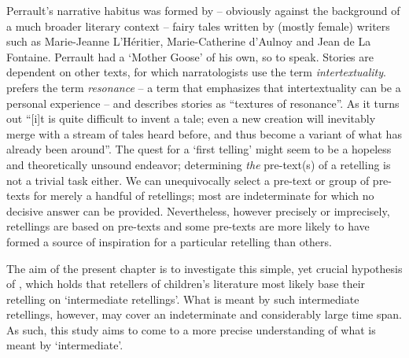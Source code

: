 Perrault's narrative habitus was formed by -- obviously against the background of a much broader literary context -- fairy tales written by (mostly female) writers such as Marie-Jeanne L'Héritier, Marie-Catherine d'Aulnoy and Jean de La Fontaine\autocites[76]{warner:1995}[44]{zipes:2012}. Perrault had a `Mother Goose' of his own, so to speak\autocite[44--45]{zipes:2012}. Stories are dependent on other texts, for which narratologists use the term \emph{intertextuality}. \citeauthor{frank:2010} prefers the term \emph{resonance} -- a term that emphasizes that intertextuality can be a personal experience -- and describes stories as ``textures of resonance''\autocite[37]{frank:2010}. As it turns out ``[i]t is quite difficult to invent a tale; even a new creation will inevitably merge with a stream of tales heard before, and thus become a variant of what has already been around''\autocite[70]{burkert:1996}. The quest for a `first telling' might seem to be a hopeless and theoretically unsound endeavor; determining \emph{the} pre-text(s) of a retelling is not a trivial task either. We can unequivocally select a pre-text or group of pre-texts for merely a handful of retellings; most are indeterminate for which no decisive answer can be provided. Nevertheless, however precisely or imprecisely, retellings are based on pre-texts and some pre-texts are more likely to have formed a source of inspiration for a particular retelling than others.

The aim of the present chapter is to investigate this simple, yet crucial hypothesis of \citeauthor{stephens_mccallum}, which holds that retellers of children's literature most likely base their retelling on `intermediate retellings'. What is meant by such intermediate retellings, however, may cover an indeterminate and considerably large time span. As such, this study aims to come to a more precise understanding of what is meant by `intermediate'. 

